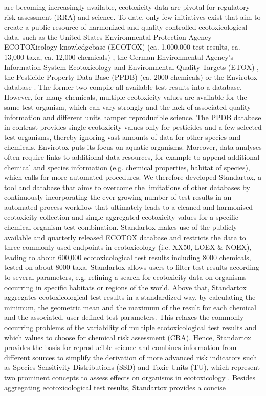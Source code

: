 are becoming increasingly available, ecotoxicity data are pivotal for regulatory risk assessment (RRA) and science. To date, only few initiatives exist that aim to create a public resource of harmonized and quality controlled ecotoxicological data, such as the United States Environmental Protection Agency ECOTOXicology knowledgebase (ECOTOX) (ca. 1,000,000 test results, ca. 13,000 taxa, ca. 12,000 chemicals) \citep{elonen_ecotoxicology_2018}, the German Environmental Agency's Information System Ecotoxicology and Environmental Quality Targets (ETOX) \citep{umweltbundesamt_etox_2019}, the Pesticide Property Data Base (PPDB) (ca. 2000 chemicals) \citep{lewis_international_2016} or the Envirotox database \citep{healthandenvironmentalsciencesinstitutehesi_envirotox_2019, connors_creation_2019}. The former two compile all available test results into a database. However, for many chemicals, multiple ecotoxicity values are available for the same test organism, which can vary strongly and the lack of associated quality information and different units hamper reproducible science. The PPDB database in contrast provides single ecotoxicity values only for pesticides and a few selected test organisms, thereby ignoring vast amounts of data for other species and chemicals. Envirotox puts its focus on aquatic organisms. Moreover, data analyses often require links to additional data resources, for example to append additional chemical and species information (e.g. chemical properties, habitat of species), which calls for more automated procedures. We therefore developed Standartox, a tool and database that aims to overcome the limitations of other databases by continuously incorporating the ever-growing number of test results in an automated process workflow that ultimately leads to a cleaned and harmonised ecotoxicity collection and single aggregated ecotoxicity values for a specific chemical-organism test combination. Standartox makes use of the publicly available and quarterly released ECOTOX database \citep{usepa_ecotox_2019} and restricts the data to three commonly used endpoints in ecotoxicology (i.e. XX50, LOEX \& NOEX), leading to about 600,000 ecotoxicological test results including 8000 chemicals, tested on about 8000 taxa. Standartox allows users to filter test results according to several parameters, e.g. refining a search for ecotoxicity data on organisms occurring in specific habitats or regions of the world. Above that, Standartox aggregates ecotoxicological test results in a standardized way, by calculating the minimum, the geometric mean and the maximum of the result for each chemical and the associated, user-defined test parameters. This relaxes the commonly occurring problems of the variability of multiple ecotoxicological test results and which values to choose for chemical risk assessment (CRA). Hence, Standartox provides the basis for reproducible science and combines information from different sources to simplify the derivation of more advanced risk indicators such as Species Sensitivity Distributions (SSD) and Toxic Units (TU), which represent two prominent concepts to assess effects on organisms in ecotoxicology \citep{posthuma_species_2002, kefford_definition_2011, schafer_effects_2011}. Besides aggregating ecotoxicological test results, Standartox provides a concise 